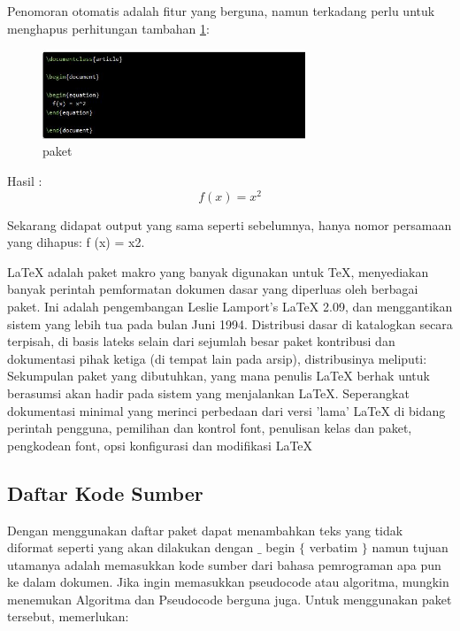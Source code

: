 \vspace{12pt}
\hspace{0.50in} Penomoran otomatis adalah fitur yang berguna, namun terkadang perlu untuk menghapus perhitungan tambahan \ref{paket}:
\begin{figure}[ht]
	\centerline{\includegraphics[width=0.70\textwidth]{gambar/paket}}
	\caption{paket}
	\label{paket}
\end{figure}

\hspace{0.50in}Hasil :
\begin{equation}
f(x) = x^2
\end{equation}

\vspace{12pt}
\hspace{0.50in} Sekarang didapat output yang sama seperti sebelumnya, hanya nomor persamaan yang dihapus: f (x) = x2.\par
\hspace{0.50in} LaTeX adalah paket makro yang banyak digunakan untuk TeX, menyediakan banyak perintah pemformatan dokumen dasar yang diperluas oleh berbagai paket. Ini adalah pengembangan Leslie Lamport's LaTeX 2.09, dan menggantikan sistem yang lebih tua pada bulan Juni 1994. Distribusi dasar di katalogkan secara terpisah, di basis lateks selain dari sejumlah besar paket kontribusi dan dokumentasi pihak ketiga (di tempat lain pada arsip), distribusinya meliputi: Sekumpulan paket yang dibutuhkan, yang mana penulis LaTeX berhak untuk berasumsi akan hadir pada sistem yang menjalankan LaTeX. Seperangkat dokumentasi minimal yang merinci perbedaan dari versi 'lama' LaTeX di bidang perintah pengguna, pemilihan dan kontrol font, penulisan kelas dan paket, pengkodean font, opsi konfigurasi dan modifikasi LaTeX \par

\subsection{Daftar Kode Sumber}\par
\hspace{0.50in} Dengan menggunakan daftar paket dapat menambahkan teks yang tidak diformat seperti yang akan dilakukan dengan  $ \_ $  begin  $ \{ $ verbatim $ \} $  namun tujuan utamanya adalah memasukkan kode sumber dari bahasa pemrograman apa pun ke dalam dokumen. Jika ingin memasukkan pseudocode atau algoritma, mungkin menemukan Algoritma dan Pseudocode berguna juga. Untuk menggunakan paket tersebut, memerlukan: 


